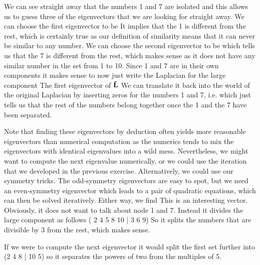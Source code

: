 We can see straight away that the numbers 1 and 7 are isolated and this allows us to guess three of the eigenvectors that we are looking for straight away. We can choose the first eigenvector to be
It implies that the 1 is different from the rest, which is certainly true as our definition of similarity means that it can never be similar to any number. 
We can choose the second eigenvector to be 
which tells us that the 7 is different from the rest, which makes sense as it does not have any similar number in the set from 1 to 10. Since 1 and 7 are in their own components it makes sense to now just write the Laplacian for the large component
The first eigenvector of $\bf \tilde{L}$ 
We can translate it back into the world of the original Laplacian by inserting zeros for the numbers 1 and 7, i.e. 
which just tells us that the rest of the numbers belong together once the 1 and the 7 have been separated.

Note that finding these eigenvectors by deduction often yields more reasonable eigenvectors than numerical computation as the numerics tends to mix the eigenvectors with identical eigenvalues into a wild mess. Nevertheless, we might want to compute the next eigenvalue numerically, or we could use the iteration that we developed in the previous exercise. Alternatively, we could use our symmetry tricks. The odd-symmetry eigenvectors are easy to spot, but we need an even-symmetry eigenvector which leads to a pair of quadratic equations, which can then be solved iteratively. Either way, we find 
This is an interesting vector. Obviously, it does not want to talk about node 1 and 7.  Instead it divides the large component as follows ( 2 4 5 8 10 | 3 6 9)
So it splits the numbers that are divisible by 3 from the rest, which makes sense.  

If we were to compute the next eigenvector it would split the first set further into (2 4 8 | 10 5) so it separates the powers of two from the multiples of 5.
